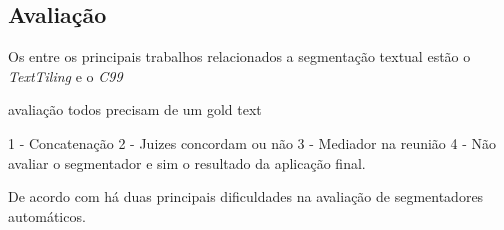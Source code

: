 \subsection{Avaliação}

Os entre os principais trabalhos relacionados a segmentação textual estão o \textit{TextTiling} e o \textit{C99}


avaliação
todos precisam de um gold text

	1 - Concatenação
	2 - Juizes concordam ou não 
	3 - Mediador na reunião
	4 - Não avaliar o segmentador e sim o resultado da aplicação final.
	
	

De acordo com \cite{fulano} há duas principais dificuldades na avaliação de segmentadores automáticos.